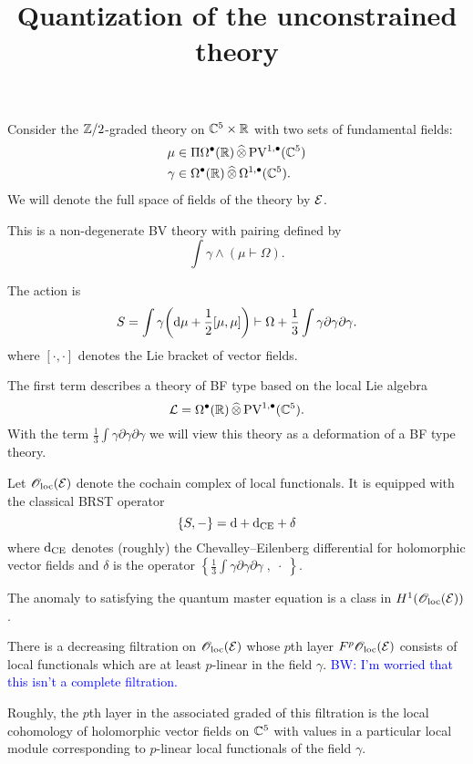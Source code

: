 \documentclass[11pt]{amsart}
\numberwithin{equation}{section}
\def\brian{\textcolor{blue}{BW: }\textcolor{blue}}
\def\PV{{\rm PV}}
\begin{document}
\title{Quantization of the unconstrained theory}

\maketitle

Consider the $\mathbb Z/2$-graded theory on $\mathbb C^5 \times \mathbb R$ with two sets of fundamental fields:
\begin{align*}
\mu & \in \Pi \Omega^\bu (\RR) \, \Hat{\otimes} \, \PV^{1,\bu}(\CC^5) \\
\gamma & \in \Omega^{\bu}(\RR) \, \Hat{\otimes} \, \Omega^{1,\bu}(\CC^5) .
\end{align*}
We will denote the full space of fields of the theory by $\mathcal E$. 

This is a non-degenerate BV theory with pairing defined by
\[
\int \gamma \wedge (\mu \vdash \Omega) .
\] 

The action is 
\[
S = \int \gamma \bigg({\rm d} \mu + \frac12 [\mu, \mu] \bigg) \vdash \Omega + \frac13 \int \gamma \partial \gamma \partial \gamma .
\]
where $[\cdot, \cdot]$ denotes the Lie bracket of vector fields. 

The first term describes a theory of BF type based on the local Lie algebra 
\[
\cL = \Omega^\bu(\RR) \, \Hat{\otimes} \, \PV^{1,\bu}(\CC^5) .
\]
With the term $\frac13\int \gamma \partial \gamma \partial \gamma$ we will view this theory as a deformation of a BF type theory. 

Let ${\mathscr O}_{\rm loc}(\mathcal E)$ denote the cochain complex of local functionals.
It is equipped with the classical BRST operator 
\[
\{S, -\} = {\rm d} + {\rm d}_{\rm CE} + \delta 
\]
where ${\rm d}_{\rm CE}$ denotes (roughly) the Chevalley--Eilenberg differential for holomorphic vector fields and $\delta$ is the operator $\left\{\frac13 \int \gamma \partial \gamma \partial \gamma \;, \; \cdot \; \right\}$. 

The anomaly to satisfying the quantum master equation is a class in $H^1 ({\mathscr O}_{\rm loc}(\mathcal E))$. 

There is a decreasing filtration on ${\mathscr O}_{\rm loc}(\mathcal E)$ whose $p$th layer $F^p {\mathscr O}_{\rm loc}(\mathcal E)$ consists of local functionals which are at least $p$-linear in the field $\gamma$. 
\brian{I'm worried that this isn't a complete filtration.}

Roughly, the $p$th layer in the associated graded of this filtration is the local cohomology of holomorphic vector fields on $\mathbb C^5$ with values in a particular local module corresponding to $p$-linear local functionals of the field $\gamma$. 
\end{document}
